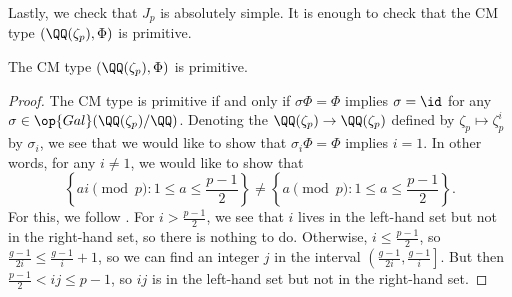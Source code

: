 \documentclass{article}
\begin{document}
Lastly, we check that $J_p$ is absolutely simple. It is enough to check that the CM type $(\QQ(\zeta_p),\Phi)$ is primitive.
\begin{lemma}
	The CM type $(\QQ(\zeta_p),\Phi)$ is primitive.
\end{lemma}
\begin{proof}
	The CM type is primitive if and only if $\sigma\Phi=\Phi$ implies $\sigma=\id$ for any $\sigma\in\op{Gal}(\QQ(\zeta_p)/\QQ)$. Denoting the $\QQ(\zeta_p)\to\QQ(\zeta_p)$ defined by $\zeta_p\mapsto\zeta_p^i$ by $\sigma_i$, we see that we would like to show that $\sigma_i\Phi=\Phi$ implies $i=1$. In other words, for any $i\ne1$, we would like to show that
	\[\left\{ai\pmod p:1\le a\le\frac{p-1}2\right\}\ne\left\{a\pmod p:1\le a\le\frac{p-1}2\right\}.\]
	For this, we follow \cite[Lemma~4.2]{goodson-fermat-av-degeneracy}. For $i>\frac{p-1}2$, we see that $i$ lives in the left-hand set but not in the right-hand set, so there is nothing to do. Otherwise, $i\le\frac{p-1}2$, so $\frac{g-1}{2i}\le\frac{g-1}i+1$, so we can find an integer $j$ in the interval $\left(\frac{g-1}{2i},\frac{g-1}i\right]$. But then $\frac{p-1}2<ij\le p-1$, so $ij$ is in the left-hand set but not in the right-hand set.
\end{proof}
\end{document}
